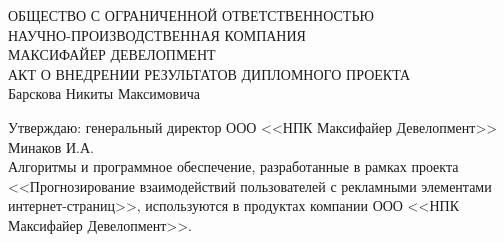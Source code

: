 
\begin{center}
    ОБЩЕСТВО С ОГРАНИЧЕННОЙ ОТВЕТСТВЕННОСТЬЮ \\
    НАУЧНО-ПРОИЗВОДСТВЕННАЯ КОМПАНИЯ \\
    МАКСИФАЙЕР ДЕВЕЛОПМЕНТ\vspace{28pt}\\
    АКТ О ВНЕДРЕНИИ РЕЗУЛЬТАТОВ ДИПЛОМНОГО ПРОЕКТА\\
    Барскова Никиты Максимовича
\end{center}

\singlespacing{}
Утверждаю: генеральный директор ООО <<НПК Максифайер Девелопмент>>
Минаков И.А.\vspace{28pt}\\

Алгоритмы и программное обеспечение, разработанные в рамках проекта <<Прогнозирование взаимодействий
пользователей с рекламными элементами интернет-страниц>>, используются в продуктах компании
ООО <<НПК Максифайер Девелопмент>>.\vspace{28pt}\\
\vfill